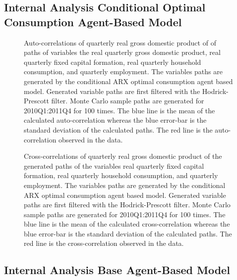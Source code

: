 \pagebreak

\subsection{Internal Analysis Conditional Optimal Consumption Agent-Based Model}

\begin{figure}[h!]
    \centering
    
		\caption{Auto-correlations of quarterly real gross domestic product of of paths of variables the real quarterly gross domestic product, real quarterly fixed capital formation, real quarterly household consumption, and quarterly employment. The variables paths are generated by the conditional ARX optimal consumption agent based model. Generated variable paths are first filtered with the Hodrick-Prescott filter. Monte Carlo sample paths are generated for 2010Q1:2011Q4 for 100 times. The blue line is the mean of the calculated auto-correlation whereas the blue error-bar is the standard deviation of the calculated paths. The red line is the auto-correlation observed in the data.}
    \label{fig:autocorr-oc-abmx}
\end{figure}


\begin{figure}[h!]
    \centering
      
    \caption{Cross-correlations of quarterly real gross domestic product of the generated paths of the variables real quarterly fixed capital formation, real quarterly household consumption, and quarterly employment. The variables paths are generated by the conditional ARX optimal consumption agent based model. Generated variable paths are first filtered with the Hodrick-Prescott filter. Monte Carlo sample paths are generated for 2010Q1:2011Q4 for 100 times. The blue line is the mean of the calculated cross-correlation whereas the blue error-bar is the standard deviation of the calculated paths. The red line is the cross-correlation observed in the data.}
    \label{fig:crosscorr-oc-abmx}
\end{figure}

\pagebreak

\subsection{Internal Analysis Base Agent-Based Model}

